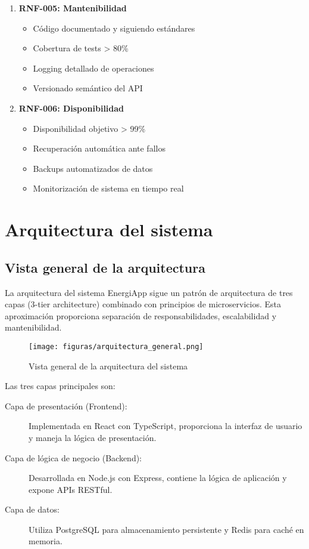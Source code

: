 \begin{enumerate}
    \item \textbf{RNF-005: Mantenibilidad}
    \begin{itemize}
        \item Código documentado y siguiendo estándares
        \item Cobertura de tests > 80\%
        \item Logging detallado de operaciones
        \item Versionado semántico del API
    \end{itemize}
    
    \item \textbf{RNF-006: Disponibilidad}
    \begin{itemize}
        \item Disponibilidad objetivo > 99\%
        \item Recuperación automática ante fallos
        \item Backups automatizados de datos
        \item Monitorización de sistema en tiempo real
    \end{itemize}
\end{enumerate}

\section{Arquitectura del sistema}

\subsection{Vista general de la arquitectura}

La arquitectura del sistema EnergiApp sigue un patrón de arquitectura de tres capas (3-tier architecture) combinado con principios de microservicios. Esta aproximación proporciona separación de responsabilidades, escalabilidad y mantenibilidad.

\begin{figure}[H]
    \centering
    \texttt{[image: figuras/arquitectura\_general.png]}
    \caption{Vista general de la arquitectura del sistema}
    \label{fig:arquitectura_general}
\end{figure}

Las tres capas principales son:

\begin{description}
    \item[Capa de presentación (Frontend):] Implementada en React con TypeScript, proporciona la interfaz de usuario y maneja la lógica de presentación.
    
    \item[Capa de lógica de negocio (Backend):] Desarrollada en Node.js con Express, contiene la lógica de aplicación y expone APIs RESTful.
    
    \item[Capa de datos:] Utiliza PostgreSQL para almacenamiento persistente y Redis para caché en memoria.
\end{description}

